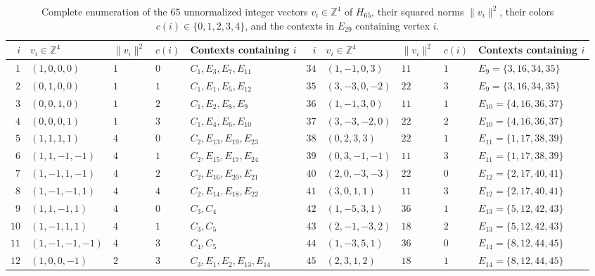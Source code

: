 \documentclass[
  aps,
  pra,
  reprint,
  superscriptaddress,
  amsmath,
  amssymb,
  nofootinbib,
  floatfix
]{revtex4-2}
\theoremstyle{definition}
\theoremstyle{remark}
\begin{document}
\begin{table}[t]
\caption{Complete enumeration of the $65$ unnormalized integer vectors $v_i\in\mathbb{Z}^4$ of $H_{65}$, their squared norms $\|v_i\|^2$, their colors $c(i)\in\{0,1,2,3,4\}$, and the contexts in $E_{29}$ containing vertex $i$.}\label{tab:app-h65-vectors}
\scriptsize
\begin{ruledtabular}
\begin{tabular}{rllll|rllll}
$i$ & $v_i\in\mathbb{Z}^4$ & $\|v_i\|^2$ & $c(i)$ & Contexts containing $i$ &
$i$ & $v_i\in\mathbb{Z}^4$ & $\|v_i\|^2$ & $c(i)$ & Contexts containing $i$ \\ \hline
$1$  & $(1,0,0,0)$     & $1$  & $0$ & $C_1,E_3,E_7,E_{11}$ &
$34$ & $(1,-1,0,3)$    & $11$ & $1$ & $E_9=\{3,16,34,35\}$ \\
$2$  & $(0,1,0,0)$     & $1$  & $1$ & $C_1,E_1,E_5,E_{12}$ &
$35$ & $(3,-3,0,-2)$   & $22$ & $3$ & $E_9=\{3,16,34,35\}$ \\
$3$  & $(0,0,1,0)$     & $1$  & $2$ & $C_1,E_2,E_8,E_9$ &
$36$ & $(1,-1,3,0)$    & $11$ & $1$ & $E_{10}=\{4,16,36,37\}$ \\
$4$  & $(0,0,0,1)$     & $1$  & $3$ & $C_1,E_4,E_6,E_{10}$ &
$37$ & $(3,-3,-2,0)$   & $22$ & $2$ & $E_{10}=\{4,16,36,37\}$ \\
$5$  & $(1,1,1,1)$     & $4$  & $0$ & $C_2,E_{13},E_{19},E_{23}$ &
$38$ & $(0,2,3,3)$     & $22$ & $1$ & $E_{11}=\{1,17,38,39\}$ \\
$6$  & $(1,1,-1,-1)$   & $4$  & $1$ & $C_2,E_{15},E_{17},E_{24}$ &
$39$ & $(0,3,-1,-1)$   & $11$ & $3$ & $E_{11}=\{1,17,38,39\}$ \\
$7$  & $(1,-1,1,-1)$   & $4$  & $2$ & $C_2,E_{16},E_{20},E_{21}$ &
$40$ & $(2,0,-3,-3)$   & $22$ & $0$ & $E_{12}=\{2,17,40,41\}$ \\
$8$  & $(1,-1,-1,1)$   & $4$  & $4$ & $C_2,E_{14},E_{18},E_{22}$ &
$41$ & $(3,0,1,1)$     & $11$ & $3$ & $E_{12}=\{2,17,40,41\}$ \\
$9$  & $(1,1,-1,1)$    & $4$  & $0$ & $C_3,C_4$ &
$42$ & $(1,-5,3,1)$    & $36$ & $1$ & $E_{13}=\{5,12,42,43\}$ \\
$10$ & $(1,-1,1,1)$    & $4$  & $1$ & $C_3,C_5$ &
$43$ & $(2,-1,-3,2)$   & $18$ & $2$ & $E_{13}=\{5,12,42,43\}$ \\
$11$ & $(1,-1,-1,-1)$  & $4$  & $3$ & $C_4,C_5$ &
$44$ & $(1,-3,5,1)$    & $36$ & $0$ & $E_{14}=\{8,12,44,45\}$ \\
$12$ & $(1,0,0,-1)$    & $2$  & $3$ & $C_3,E_1,E_2,E_{13},E_{14}$ &
$45$ & $(2,3,1,2)$     & $18$ & $1$ & $E_{14}=\{8,12,44,45\}$ \\

\end{tabular}
\end{ruledtabular}
\end{table}
\end{document}
